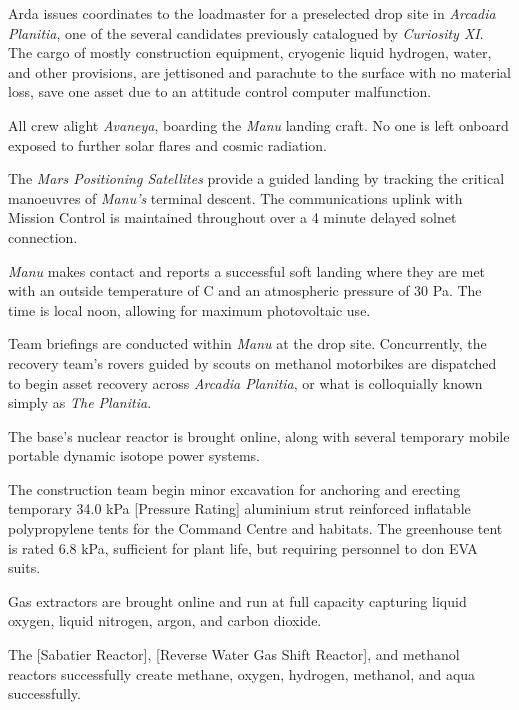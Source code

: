 Arda issues coordinates to the loadmaster for a preselected drop site in {\it Arcadia Planitia}, one of the several candidates previously catalogued by {\it Curiosity XI}. The cargo of mostly construction equipment, cryogenic liquid hydrogen, water, and other provisions, are jettisoned and parachute to the surface with no material loss, save one asset due to an attitude control computer malfunction.
\StopTimelineDate

All crew alight {\it Avaneya}, boarding the {\it Manu} landing craft. No one is left onboard exposed to further solar flares and cosmic radiation.

The {\it Mars Positioning Satellites} provide a guided landing by tracking the critical manoeuvres of {\it Manu's} terminal descent. The communications uplink with Mission Control is maintained throughout over a 4 minute delayed solnet connection.

{\it Manu} makes contact and reports a successful soft landing where they are met with an outside temperature of C and an atmospheric pressure of 30 Pa. The time is local noon, allowing for maximum photovoltaic use.

Team briefings are conducted within {\it Manu} at the drop site. Concurrently, the recovery team's rovers guided by scouts on methanol motorbikes are dispatched to begin asset recovery across {\it Arcadia Planitia}, or what is colloquially known simply as {\it The Planitia}.

The base's nuclear reactor is brought online, along with several temporary mobile portable dynamic isotope power systems.

The construction team begin minor excavation for anchoring and erecting temporary 34.0 kPa [Pressure Rating] aluminium strut reinforced inflatable polypropylene tents for the Command Centre and habitats. The greenhouse tent is rated 6.8 kPa, sufficient for plant life, but requiring personnel to don EVA suits.
\StopTimelineDate

Gas extractors are brought online and run at full capacity capturing liquid oxygen, liquid nitrogen, argon, and carbon dioxide. 

The [Sabatier Reactor], [Reverse Water Gas Shift Reactor], and methanol reactors successfully create methane, oxygen, hydrogen, methanol, and aqua successfully.
\StopTimelineDate

